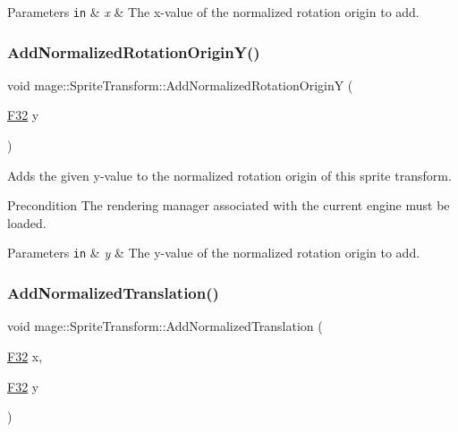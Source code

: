 \begin{DoxyParams}[1]{Parameters}
\mbox{\tt in}  & {\em x} & The x-\/value of the normalized rotation origin to add. \\
\hline
\end{DoxyParams}
\hypertarget{classmage_1_1_sprite_transform_a322c799c3cc72ac44dbc1a2ed1234a67}{}\label{classmage_1_1_sprite_transform_a322c799c3cc72ac44dbc1a2ed1234a67} 
\subsubsection{\texorpdfstring{Add\+Normalized\+Rotation\+Origin\+Y()}{AddNormalizedRotationOriginY()}}
{\footnotesize\ttfamily void mage\+::\+Sprite\+Transform\+::\+Add\+Normalized\+Rotation\+OriginY (\begin{DoxyParamCaption}\item[{\hyperlink{namespacemage_aa97e833b45f06d60a0a9c4fc22ae02c0}{F32}}]{y }\end{DoxyParamCaption})}

Adds the given y-\/value to the normalized rotation origin of this sprite transform.

\begin{DoxyPrecond}{Precondition}
The rendering manager associated with the current engine must be loaded. 
\end{DoxyPrecond}

\begin{DoxyParams}[1]{Parameters}
\mbox{\tt in}  & {\em y} & The y-\/value of the normalized rotation origin to add. \\
\hline
\end{DoxyParams}
\hypertarget{classmage_1_1_sprite_transform_a4a55fcd4d288b5d7f7703b9a6232b2d1}{}\label{classmage_1_1_sprite_transform_a4a55fcd4d288b5d7f7703b9a6232b2d1} 
\subsubsection{\texorpdfstring{Add\+Normalized\+Translation()}{AddNormalizedTranslation()}\hspace{0.1cm}{\footnotesize\ttfamily [1/3]}}
{\footnotesize\ttfamily void mage\+::\+Sprite\+Transform\+::\+Add\+Normalized\+Translation (\begin{DoxyParamCaption}\item[{\hyperlink{namespacemage_aa97e833b45f06d60a0a9c4fc22ae02c0}{F32}}]{x,  }\item[{\hyperlink{namespacemage_aa97e833b45f06d60a0a9c4fc22ae02c0}{F32}}]{y }\end{DoxyParamCaption})}

